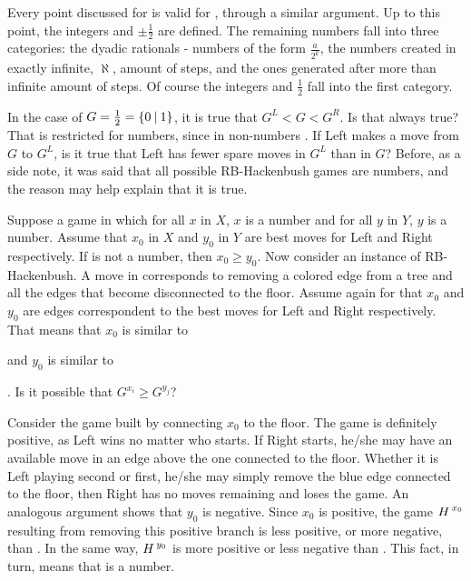 Every point discussed for  is valid for , through a similar argument. Up to this point, the integers and $\pm \frac{1}{2}$ are defined. The remaining numbers fall into three categories: the dyadic rationals - numbers of the form $\frac{a}{2^k}$, the numbers created in exactly infinite, $\aleph$, amount of steps, and the ones generated after more than infinite amount of steps. Of course the integers and $\frac{1}{2}$ fall into the first category.

In the case of $\mbox{$G$} = \frac{1}{2} = \mbox{$\{0\:|\:1\}$}$, it is true that $G^L < G < G^R$. Is that always true? That is restricted for numbers, since in non-numbers . If Left makes a move from $G$ to $G^L$, is it true that Left has fewer spare moves in $G^L$ than in $G$? Before, as a side note, it was said that all possible RB-Hackenbush games are numbers, and the reason may help explain that it is true.

Suppose a game  in which for all $x$ in $X$, $x$  is a number and for all $y$ in $Y$, $y$ is a number. Assume that $x_0$ in $X$ and $y_0$ in $Y$ are best moves for Left and Right respectively. If \Gm{} is not a number, then $x_0 \ge y_0$. Now consider \Hm an instance of RB-Hackenbush. A move in \Hm corresponds to removing a colored edge from a tree and all the edges that become disconnected to the floor. Assume again for \Hm that $x_0$ and $y_0$ are edges correspondent to the best moves for Left and Right respectively. That means that $x_0$ is similar to  
 and $y_0$ is similar to 
. Is it possible that $G^{x_i} \ge G^{y_j}$?

Consider the game built by connecting $x_0$ to the floor. The game is definitely positive, as Left wins no matter who starts. If Right starts, he/she may have an available move in an edge above the one connected to the floor. Whether it is Left playing second or first, he/she may simply remove the blue edge connected to the floor, then Right has no moves remaining and loses the game. An analogous argument shows that $y_0$ is negative. Since $x_0$ is positive, the game $\mbox{$H\,$}^{x_0}$ resulting from removing this positive branch is less positive, or more negative, than \Hm. In the same way, $\mbox{$H\,$}^{y_0}$ is more positive or less negative than \Hm. This fact, in turn, means that \Hm is a number.

